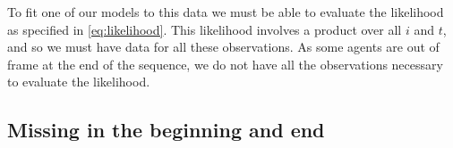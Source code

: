 To fit one of our models to this data we must be able to evaluate the
likelihood as specified in \cref{eq:likelihood}. This likelihood involves a
product over all $i$ and $t$, and so we must have data for all these
observations. As some agents are out of frame at the end of the sequence, we do
not have all the observations necessary to evaluate the likelihood.



\subsection{Missing in the beginning and end}

